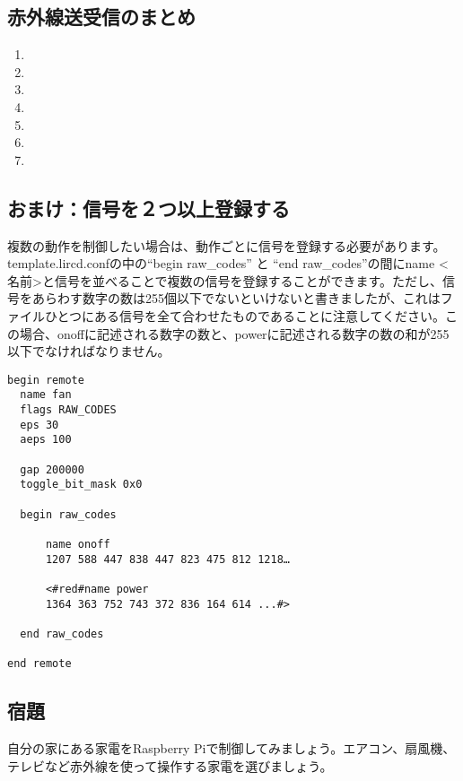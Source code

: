 \subsection{赤外線送受信のまとめ}
\begin{enumerate}
\item {}
\item {}
\item {}
\item {}
\item {}
\item {}
\item {}
\end{enumerate}

\subsection{おまけ：信号を２つ以上登録する}
複数の動作を制御したい場合は、動作ごとに信号を登録する必要があります。template.lircd.confの中の“begin raw\_codes” と “end raw\_codes”の間にname <名前>と信号を並べることで複数の信号を登録することができます。ただし、信号をあらわす数字の数は255個以下でないといけないと書きましたが、これはファイルひとつにある信号を全て合わせたものであることに注意してください。この場合、onoffに記述される数字の数と、powerに記述される数字の数の和が255以下でなければなりません。\\

\begin{lstlisting}[caption=２つの信号を登録するときのtemplate.lircd.comf,label=２つの信号を登録するときのtemplate.lircd.comf]
begin remote
  name fan
  flags RAW_CODES
  eps 30
  aeps 100

  gap 200000
  toggle_bit_mask 0x0

  begin raw_codes

      name onoff
      1207 588 447 838 447 823 475 812 1218…

      <#red#name power
      1364 363 752 743 372 836 164 614 ...#>

  end raw_codes

end remote
\end{lstlisting}

\subsection{宿題}
自分の家にある家電をRaspberry Piで制御してみましょう。エアコン、扇風機、テレビなど赤外線を使って操作する家電を選びましょう。